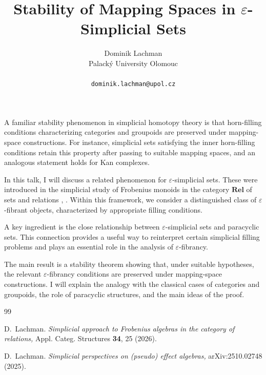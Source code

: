 \documentclass[a4paper]{article} %
\date{} %
\begin{document}
\setcounter{page}{1} %

\title{Stability of Mapping Spaces in $\varepsilon$-Simplicial Sets}

\author{Dominik Lachman\\ %
       Palacký University Olomouc\\ \\ %
       \texttt{dominik.lachman@upol.cz} %
       }%

\maketitle


A familiar stability phenomenon in simplicial homotopy theory is that horn-filling conditions characterizing categories and groupoids are preserved under mapping-space constructions. For instance, simplicial sets satisfying the inner horn-filling conditions retain this property after passing to suitable mapping spaces, and an analogous statement holds for Kan complexes.


In this talk, I will discuss a related phenomenon for $\varepsilon$-simplicial sets. These were introduced in the simplicial study of Frobenius monoids in the category $\mathbf{Rel}$ of sets and relations \cite{Lachman2026}, \cite{Lachman2025}. Within this framework, we consider a distinguished class of $\varepsilon$-fibrant objects, characterized by appropriate filling conditions.

A key ingredient is the close relationship between $\varepsilon$-simplicial sets and paracyclic sets. This connection provides a useful way to reinterpret certain simplicial filling problems and plays an essential role in the analysis of $\varepsilon$-fibrancy.

The main result is a stability theorem showing that, under suitable hypotheses, the relevant $\varepsilon$-fibrancy conditions are preserved under mapping-space constructions. I will explain the analogy with the classical cases of categories and groupoids, the role of paracyclic structures, and the main ideas of the proof.

\begin{thebibliography}{99}

D.~Lachman.
\newblock \emph{Simplicial approach to Frobenius algebras in the category of relations,}
\newblock Appl. Categ. Structures \textbf{34}, 25 (2026).

D.~Lachman.
\newblock \emph{Simplicial perspectives on (pseudo) effect algebras,}
\newblock arXiv:2510.02748 (2025).

\end{thebibliography}
\end{document}
